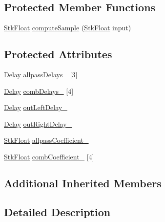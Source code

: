 \subsection*{Protected Member Functions}
\begin{DoxyCompactItemize}
\item 
\hyperlink{namespace_nyq_a044fa20a706520a617bbbf458a7db7e4}{Stk\+Float} \hyperlink{class_nyq_1_1_j_c_rev_a5c8997a3c04c00c1b5e7daf40ba68f89}{compute\+Sample} (\hyperlink{namespace_nyq_a044fa20a706520a617bbbf458a7db7e4}{Stk\+Float} input)
\end{DoxyCompactItemize}
\subsection*{Protected Attributes}
\begin{DoxyCompactItemize}
\item 
\hyperlink{class_nyq_1_1_delay}{Delay} \hyperlink{class_nyq_1_1_j_c_rev_a3084f2988011aeb049273f27cce39fda}{allpass\+Delays\+\_\+} \mbox{[}3\mbox{]}
\item 
\hyperlink{class_nyq_1_1_delay}{Delay} \hyperlink{class_nyq_1_1_j_c_rev_a31892bd62f1b742ed6a26a0eada74d62}{comb\+Delays\+\_\+} \mbox{[}4\mbox{]}
\item 
\hyperlink{class_nyq_1_1_delay}{Delay} \hyperlink{class_nyq_1_1_j_c_rev_a87b2ebba166098a298d8c69908ab4223}{out\+Left\+Delay\+\_\+}
\item 
\hyperlink{class_nyq_1_1_delay}{Delay} \hyperlink{class_nyq_1_1_j_c_rev_accd2119bb6707300ce2fb586b92d6ac2}{out\+Right\+Delay\+\_\+}
\item 
\hyperlink{namespace_nyq_a044fa20a706520a617bbbf458a7db7e4}{Stk\+Float} \hyperlink{class_nyq_1_1_j_c_rev_a7710dad6151fa10066394df81440533e}{allpass\+Coefficient\+\_\+}
\item 
\hyperlink{namespace_nyq_a044fa20a706520a617bbbf458a7db7e4}{Stk\+Float} \hyperlink{class_nyq_1_1_j_c_rev_ac33893bcdb8e62939ea8807a22fe5502}{comb\+Coefficient\+\_\+} \mbox{[}4\mbox{]}
\end{DoxyCompactItemize}
\subsection*{Additional Inherited Members}


\subsection{Detailed Description}


